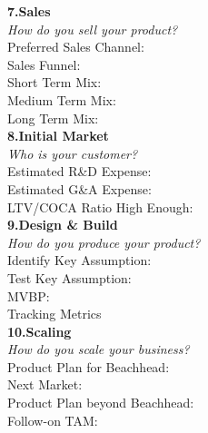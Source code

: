 \documentclass[a4paper]{article}
\begin{document}
\textbf{7.Sales}\\
\textit{How do you sell your product?}\\
Preferred Sales Channel:\\
Sales Funnel:\\
Short Term Mix:\\
Medium Term Mix:\\
Long Term Mix:\\

\textbf{8.Initial Market}\\
\textit{Who is your customer?}\\
Estimated R\&D Expense:\\
Estimated G\&A Expense:\\
LTV/COCA Ratio High Enough:\\
\newpage
\textbf{9.Design \& Build}\\
\textit{How do you produce your product?}\\
Identify Key Assumption:\\
Test Key Assumption:\\
MVBP:\\
Tracking Metrics\\

\textbf{10.Scaling}\\
\textit{How do you scale your business?}\\
Product Plan for Beachhead:\\
Next Market:\\
Product Plan beyond Beachhead:\\
Follow-on TAM:
\end{document}
